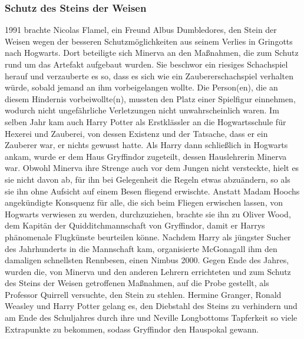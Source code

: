 \documentclass[a4paper, 10pt]{article}
\begin{document}
\subsubsection*{\large Schutz des Steins der Weisen}
1991 brachte Nicolas Flamel, ein Freund Albus Dumbledores, den Stein der Weisen wegen der besseren Schutzmöglichkeiten aus seinem Verlies in Gringotts nach Hogwarts. Dort beteiligte sich Minerva an den Maßnahmen, die zum Schutz rund um das Artefakt aufgebaut wurden. Sie beschwor ein riesiges Schachspiel herauf und verzauberte es so, dass es sich wie ein Zaubererschachspiel verhalten würde, sobald jemand an ihm vorbeigelangen wollte. Die Person(en), die an diesem Hindernis vorbeiwollte(n), mussten den Platz einer Spielfigur einnehmen, wodurch nicht ungefährliche Verletzungen nicht unwahrscheinlich waren. 
\vspace{10pt}
\newline
{}  
Im selben Jahr kam auch Harry Potter als Erstklässler an die Hogwartsschule für Hexerei und Zauberei, von dessen Existenz und der Tatsache, dass er ein Zauberer war, er nichts gewusst hatte. Als Harry dann schließlich in Hogwarts ankam, wurde er dem Haus Gryffindor zugeteilt, dessen Hauslehrerin Minerva war.
\vspace{10pt}
\newline
{}  
Obwohl Minerva ihre Strenge auch vor dem Jungen nicht versteckte, hielt es sie nicht davon ab, für ihn bei Gelegenheit die Regeln etwas abzuändern, so als sie ihn ohne Aufsicht auf einem Besen fliegend erwischte. Anstatt Madam Hoochs angekündigte Konsquenz für alle, die sich beim Fliegen erwischen lassen, von Hogwarts verwiesen zu werden, durchzuziehen, brachte sie ihn zu Oliver Wood, dem Kapitän der Quidditchmannschaft von Gryffindor, damit er Harrys phänomenale Flugkünste beurteilen könne.
\vspace{10pt}
\newline
{}  
Nachdem Harry als jüngster Sucher des Jahrhunderts in die Mannschaft kam, organisierte McGonagall ihm den damaligen schnellsten Rennbesen, einen Nimbus 2000. Gegen Ende des Jahres, wurden die, von Minerva und den anderen Lehrern errichteten und zum Schutz des Steins der Weisen getroffenen Maßnahmen, auf die Probe gestellt, als Professor Quirrell versuchte, den Stein zu stehlen. Hermine Granger, Ronald Weasley und Harry Potter gelang es, den Diebstahl des Steins zu verhindern und am Ende des Schuljahres durch ihre und Neville Longbottoms Tapferkeit so viele Extrapunkte zu bekommen, sodass Gryffindor den Hauspokal gewann.
\end{document}
